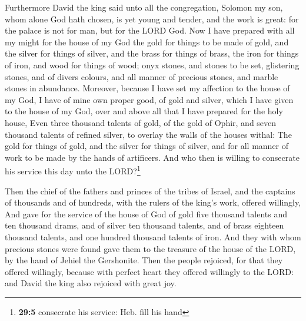  Furthermore David the king said unto all the
congregation, Solomon my son, whom alone God hath chosen, is yet young
and tender, and the work is great: for the palace is not for man, but
for the LORD God.  Now I have prepared with all my might
for the house of my God the gold for things to be made of gold, and the
silver for things of silver, and the brass for things of brass, the iron
for things of iron, and wood for things of wood; onyx stones, and stones
to be set, glistering stones, and of divers colours, and all manner of
precious stones, and marble stones in abundance. 
Moreover, because I have set my affection to the house of my God, I have
of mine own proper good, of gold and silver, which I have given to the
house of my God, over and above all that I have prepared for the holy
house,  Even three thousand talents of gold, of the gold
of Ophir, and seven thousand talents of refined silver, to overlay the
walls of the houses withal:  The gold for things of gold,
and the silver for things of silver, and for all manner of work to be
made by the hands of artificers. And who then is willing to consecrate
his service this day unto the LORD?\footnote{\textbf{29:5} consecrate
  his service: Heb. fill his hand}

 Then the chief of the fathers and princes of the tribes
of Israel, and the captains of thousands and of hundreds, with the
rulers of the king's work, offered willingly,  And gave
for the service of the house of God of gold five thousand talents and
ten thousand drams, and of silver ten thousand talents, and of brass
eighteen thousand talents, and one hundred thousand talents of iron.
 And they with whom precious stones were found gave them
to the treasure of the house of the LORD, by the hand of Jehiel the
Gershonite.  Then the people rejoiced, for that they
offered willingly, because with perfect heart they offered willingly to
the LORD: and David the king also rejoiced with great joy.

